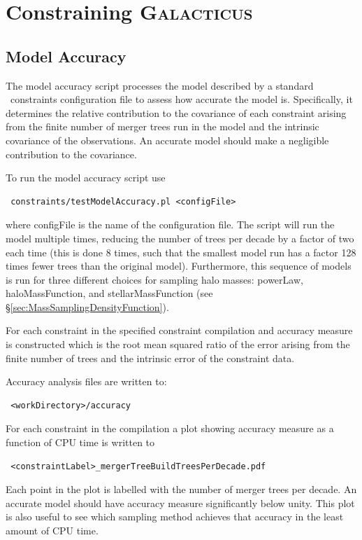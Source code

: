 \chapter{Constraining {\normalfont \scshape Galacticus}}

\section{Model Accuracy}\label{sec:ModelAccuracy}

The model accuracy script processes the model described by a standard \glc\ constraints configuration file to assess how accurate the model is. Specifically, it determines the relative contribution to the covariance of each constraint arising from the finite number of merger trees run in the model and the intrinsic covariance of the observations. An accurate model should make a negligible contribution to the covariance.

To run the model accuracy script use
\begin{verbatim}
 constraints/testModelAccuracy.pl <configFile>
\end{verbatim}
where {\normalfont \ttfamily configFile} is the name of the configuration file. The script will run the model multiple times, reducing the number of trees per decade by a factor of two each time (this is done 8 times, such that the smallest model run has a factor 128 times fewer trees than the original model). Furthermore, this sequence of models is run for three different choices for sampling halo masses: {\normalfont \ttfamily powerLaw}, {\normalfont \ttfamily haloMassFunction}, and {\normalfont \ttfamily stellarMassFunction} (see \S\ref{sec:MassSamplingDensityFunction}).

For each constraint in the specified constraint compilation and accuracy measure is constructed which is the root mean squared ratio of the error arising from the finite number of trees and the intrinsic error of the constraint data. 

Accuracy analysis files are written to:
\begin{verbatim}
 <workDirectory>/accuracy
\end{verbatim}
For each constraint in the compilation a plot showing accuracy measure as a function of CPU time is written to
\begin{verbatim}
 <constraintLabel>_mergerTreeBuildTreesPerDecade.pdf
\end{verbatim}
Each point in the plot is labelled with the number of merger trees per decade. An accurate model should have accuracy measure significantly below unity. This plot is also useful to see which sampling method achieves that accuracy in the least amount of CPU time.

